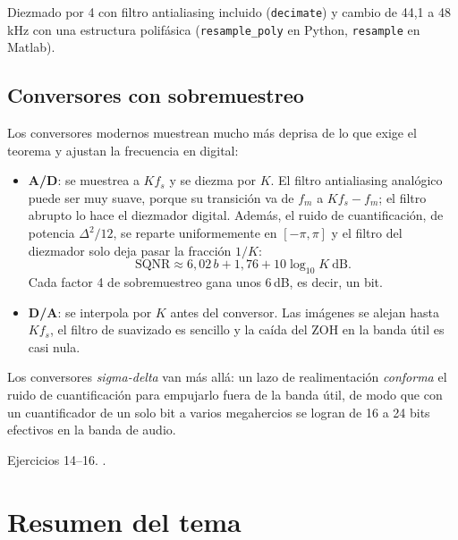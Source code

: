 \documentclass[11pt,a4paper]{scrartcl}
\begin{document}
\begin{encodigo}
  Diezmado por 4 con filtro antialiasing incluido (\texttt{decimate}) y cambio de 44,1 a 48\,kHz con una estructura polifásica (\texttt{resample\_poly} en Python, \texttt{resample} en Matlab).
\end{encodigo}

\subsection{Conversores con sobremuestreo}\label{sec:sobremuestreo}

Los conversores modernos muestrean mucho más deprisa de lo que exige el teorema y ajustan la frecuencia en digital:
\begin{itemize}
  \item \textbf{A/D}: se muestrea a $Kf_s$ y se diezma por $K$. El filtro antialiasing analógico puede ser muy suave, porque su transición va de $f_m$ a $Kf_s-f_m$; el filtro abrupto lo hace el diezmador digital. Además, el ruido de cuantificación, de potencia $\Delta^2/12$, se reparte uniformemente en $[-\pi,\pi]$ y el filtro del diezmador solo deja pasar la fracción $1/K$:
  \[
    \mathrm{SQNR}\approx6{,}02\,b+1{,}76+10\log_{10}K\ \text{dB}.
  \]
  Cada factor 4 de sobremuestreo gana unos 6\,dB, es decir, un bit.
  \item \textbf{D/A}: se interpola por $K$ antes del conversor. Las imágenes se alejan hasta $Kf_s$, el filtro de suavizado es sencillo y la caída del ZOH en la banda útil es casi nula.
\end{itemize}
Los conversores \emph{sigma-delta} van más allá: un lazo de realimentación \emph{conforma} el ruido de cuantificación para empujarlo fuera de la banda útil, de modo que con un cuantificador de un solo bit a varios megahercios se logran de 16 a 24 bits efectivos en la banda de audio.

\begin{flushright}\small\color{pdsgris}Ejercicios 14–16. .\end{flushright}

\section*{Resumen del tema}
\end{document}
